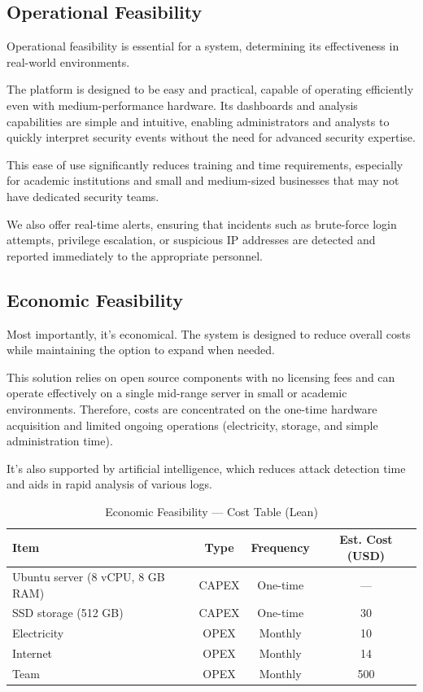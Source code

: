 \documentclass[12pt,a4paper]{report} %
\begin{document}
\subsection{Operational Feasibility}
Operational feasibility is essential for a system, determining its effectiveness in real-world environments.

The platform is designed to be easy and practical, capable of operating efficiently even with medium-performance hardware. Its dashboards and analysis capabilities are simple and intuitive, enabling administrators and analysts to quickly interpret security events without the need for advanced security expertise.

This ease of use significantly reduces training and time requirements, especially for academic institutions and small and medium-sized businesses that may not have dedicated security teams.

We also offer real-time alerts, ensuring that incidents such as brute-force login attempts, privilege escalation, or suspicious IP addresses are detected and reported immediately to the appropriate personnel.

\subsection{Economic Feasibility}
Most importantly, it's economical. The system is designed to reduce overall costs while maintaining the option to expand when needed.

This solution relies on open source components with no licensing fees and can operate effectively on a single mid-range server in small or academic environments. Therefore, costs are concentrated on the one-time hardware acquisition and limited ongoing operations (electricity, storage, and simple administration time).

It's also supported by artificial intelligence, which reduces attack detection time and aids in rapid analysis of various logs.

\begin{table}[H]
	\centering
	\caption{Economic Feasibility — Cost Table (Lean)}
	\begin{tabular}{|l|c|c|c|}
		\hline
		\textbf{Item} & \textbf{Type} & \textbf{Frequency} & \textbf{Est. Cost (USD)} \\
		\hline
		Ubuntu server (8 vCPU, 8 GB RAM) & CAPEX & One-time & --- \\
		SSD storage (512 GB) & CAPEX & One-time & 30 \\
		Electricity & OPEX & Monthly & 10 \\
		Internet & OPEX & Monthly & 14 \\
		Team & OPEX & Monthly & 500 \\
		\hline
	\end{tabular}
\end{table}
\end{document}
